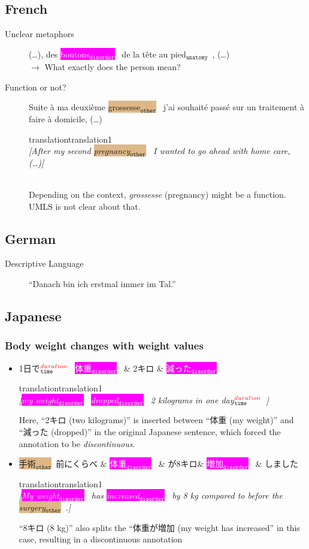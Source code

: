 \documentclass[12pt]{article}
\theoremstyle{definition}
\newcommand{\anatomy}[1]{\colorbox{dollarbill}{#1$_{\texttt{anatomy}}$}\ }
\newcommand{\disorder}[1]{\colorbox{fuchsia}{\textcolor{white}{#1$_{\texttt{disorder}}$}}\ }
\newcommand{\timexDur}[2]{\colorbox{ashgrey}{#1$_{\texttt{time}}^{\textcolor{red}{duration}}$}\ }
\newcommand{\other}[1]{\colorbox{burlywood}{#1$_{\texttt{other}}$}\ }
\newcommand{\causedRel}[2]{\depedge[edge unit distance=0.8ex, label style={fill=yellow, font= \large}]{#1}{#2}{\texttt{caused}}}
\newcommand{\discontRel}[2]{\depedge[edge unit distance=0.5em, dashed]{#1}{#2}{\texttt{discont.}}}
\newcommand{\drawRelations}[2]{
    \begin{dependency}[theme=default]
        \begin{deptext}
            #1 \\   %
        \end{deptext}
        #2          %
    \end{dependency}
}
\newcommand{\translation}[1]{\begin{ocg}{translation}{translation}{1}\footnotesize{\\\textit{[#1]}}\end{ocg}}
\begin{document}
\subsection{French}

\begin{description}
    \item[Unclear metaphors] (\ldots), des \disorder{boutons} \anatomy{de la tête au pied}, (\ldots)\\
    $\rightarrow$ What exactly does the person mean?
    
    \item[Function or not?] Suite à ma deuxième \other{grossesse} j'ai souhaité passé sur un traitement à faire à domicile, (\ldots) \translation{After my second \other{pregnancy} I wanted to go ahead with home care, (\ldots)}\\
    Depending on the context, \textit{grossesse} (pregnancy) might be a function. UMLS is not clear about that.

\end{description}

\subsection{German}

\begin{description}
    \item[Descriptive Language] ``Danach bin ich erstmal immer im Tal.''
\end{description}

\subsection{Japanese}

\subsubsection{Body weight changes with weight values}

\begin{itemize}
    \item \drawRelations{%
        \timexDur{1日で} \& \disorder{体重} \& 2キロ \& \disorder{減った}
        }{
        \discontRel{1}{4}
        }
        \translation{\disorder{my weight} \disorder{dropped} 2 kilograms \timexDur{in one day}.}
        
        Here, ``2キロ (two kilograms)'' is inserted between ``体重 (my weight)'' and ``減った (dropped)'' in the original Japanese sentence, which forced the annotation to be \textit{discontinuous}.

    \item \drawRelations{%
        \other{手術}前にくらべ \& \disorder{体重} \& が8キロ\& \disorder{増加} \& しました}{
        \discontRel{2}{4}
        }
        \translation{\disorder{My weight} has \disorder{increased} by 8 kg compared to before the \other{surgery}.}

        ``8キロ (8 kg)'' also splits the ``体重が増加 (my weight has increased'' in this case, resulting in a discontinuous annotation
\end{itemize}



\end{document}
